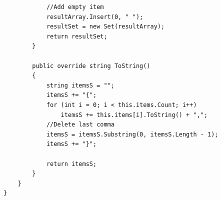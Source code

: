 \begin{lstlisting}
            //Add empty item
            resultArray.Insert(0, " ");
            resultSet = new Set(resultArray);
            return resultSet;
        }

        public override string ToString()
        {
            string itemsS = "";
            itemsS += "{";
            for (int i = 0; i < this.items.Count; i++)
                itemsS += this.items[i].ToString() + ",";
            //Delete last comma
            itemsS = itemsS.Substring(0, itemsS.Length - 1);
            itemsS += "}";

            return itemsS;
        }
    }
}

\end{lstlisting}